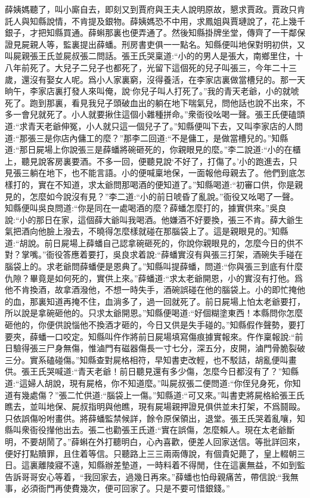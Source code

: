 \begin{parag}
    薛姨媽聽了，叫小廝自去，即刻又到賈府與王夫人說明原故，懇求賈政。賈政只肯託人與知縣說情，不肯提及銀物。薛姨媽恐不中用，求鳳姐與賈璉說了，花上幾千銀子，才把知縣買通。薛蝌那裏也便弄通了。然後知縣掛牌坐堂，傳齊了一干鄰保證見屍親人等，監裏提出薛蟠。刑房書吏俱一一點名。知縣便叫地保對明初供，又叫屍親張王氏並屍叔張二問話。張王氏哭稟道:“小的的男人是張大，南鄉里住，十八年前死了。大兒子二兒子也都死了，光留下這個死的兒子叫張三，今年二十三歲，還沒有娶女人呢。爲小人家裏窮，沒得養活，在李家店裏做當槽兒的。那一天晌午，李家店裏打發人來叫俺，說‘你兒子叫人打死了。”我的青天老爺，小的就唬死了。跑到那裏，看見我兒子頭破血出的躺在地下喘氣兒，問他話也說不出來，不多一會兒就死了。小人就要揪住這個小雜種拼命。”衆衙役吆喝一聲。張王氏便磕頭道:“求青天老爺伸冤，小人就只這一個兒子了。”知縣便叫下去，又叫李家店的人問道:“那張三是你店內傭工的麼？”那李二回道:“不是傭工，是做當槽兒的。”知縣道:“那日屍場上你說張三是薛蟠將碗砸死的，你親眼見的麼。”李二說道:“小的在櫃上，聽見說客房裏要酒。不多一回，便聽見說‘不好了，打傷了。’小的跑進去，只見張三躺在地下，也不能言語。小的便喊稟地保，一面報他母親去了。他們到底怎樣打的，實在不知道，求太爺問那喝酒的便知道了。”知縣喝道:“初審口供，你是親見的，怎麼如今說沒有見？”李二道:“小的前日唬昏了亂說。”衙役又吆喝了一聲。知縣便叫吳良問道:“你是同在一處喝酒的麼？薛蟠怎麼打的，據實供來。”吳良說:“小的那日在家，這個薛大爺叫我喝酒。他嫌酒不好要換，張三不肯。薛大爺生氣把酒向他臉上潑去，不曉得怎麼樣就碰在那腦袋上了。這是親眼見的。”知縣道:“胡說。前日屍場上薛蟠自己認拿碗砸死的，你說你親眼見的，怎麼今日的供不對？掌嘴。”衙役答應着要打，吳良求着說:“薛蟠實沒有與張三打架，酒碗失手碰在腦袋上的。求老爺問薛蟠便是恩典了。”知縣叫提薛蟠，問道:“你與張三到底有什麼仇隙？畢竟是如何死的，實供上來。”薛蟠道:“求太老爺開恩，小的實沒有打他。爲他不肯換酒，故拿酒潑他，不想一時失手，酒碗誤碰在他的腦袋上。小的即忙掩他的血，那裏知道再掩不住，血淌多了，過一回就死了。前日屍場上怕太老爺要打，所以說是拿碗砸他的。只求太爺開恩。”知縣便喝道:“好個糊塗東西！本縣問你怎麼砸他的，你便供說惱他不換酒才砸的，今日又供是失手碰的。”知縣假作聲勢，要打要夾，薛蟠一口咬定。知縣叫仵作將前日屍場填寫傷痕據實報來。仵作稟報說:“前日驗得張三尸身無傷，惟滷門有磁器傷長一寸七分，深五分，皮開，滷門骨脆裂破三分。實系磕碰傷。”知縣查對屍格相符，早知書吏改輕，也不駁詰，胡亂便叫畫供。張王氏哭喊道:“青天老爺！前日聽見還有多少傷，怎麼今日都沒有了？”知縣道:“這婦人胡說，現有屍格，你不知道麼。”叫屍叔張二便問道:“你侄兒身死，你知道有幾處傷？”張二忙供道:“腦袋上一傷。”知縣道:“可又來。”叫書吏將屍格給張王氏瞧去，並叫地保、屍叔指明與他瞧，現有屍場親押證見俱供並未打架，不爲鬪毆。只依誤傷吩咐畫供。將薛蟠監禁候詳，餘令原保領出，退堂。張王氏哭着亂嚷，知縣叫衆衙役攆他出去。張二也勸張王氏道:“實在誤傷，怎麼賴人。現在太老爺斷明，不要胡鬧了。”薛蝌在外打聽明白，心內喜歡，便差人回家送信。等批詳回來，便好打點贖罪，且住着等信。只聽路上三三兩兩傳說，有個貴妃薨了，皇上輟朝三日。這裏離陵寢不遠，知縣辦差墊道，一時料着不得閒，住在這裏無益，不如到監告訴哥哥安心等着，“我回家去，過幾日再來。”薛蟠也怕母親痛苦，帶信說:“我無事，必須衙門再使費幾次，便可回家了。只是不要可惜銀錢。”
\end{parag}



